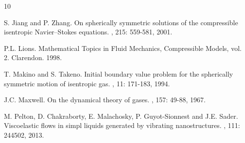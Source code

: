 \documentclass[10pt,reqno]{amsart}
\numberwithin{equation}{section}
\begin{document}
\begin{thebibliography}{10}
		
		S. Jiang and P. Zhang.
		\newblock On spherically symmetric solutions of the compressible isentropic Navier--Stokes equations.
		, 215: 559-581, 2001.
		
%		
		
		P.L. Lions.
		\newblock Mathematical Topics in Fluid Mechanics, Compressible Models, vol. 2. Clarendon. 1998.
		
		
		T. Makino and S. Takeno.
		\newblock Initial boundary value problem for the spherically symmetric motion
		of isentropic gas.
		, 11: 171-183, 1994.
		
		J.C. Maxwell.
		\newblock On the dynamical theory of gases.
		,
		157: 49-88, 1967.
		
		
		M. Pelton, D. Chakraborty, E. Malachosky, P. Guyot-Sionnest and J.E. Sader.
		\newblock Viscoelastic flows in simpl liquids generated by vibrating nanostructures.
		, 111: 244502, 2013.
		

\end{thebibliography}
\end{document}
